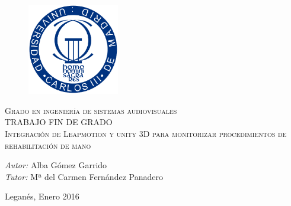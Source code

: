 \begin{titlepage}
\begin{center}

\marginsize{3.5cm}{2.5cm}{2.5cm}{2.5cm} 
\addtolength{\oddsidemargin}{0.8cm}
\vspace{1.3cm}
\begin{figure}[h]
        \centering\includegraphics[angle=0,width=4cm]{./figuras/uc3m.png}
        \label{fig:escudo}
\end{figure}
\large \textsc{Grado en ingeniería de sistemas audiovisuales} \\ [1 cm]

\large TRABAJO FIN DE GRADO\\[1 cm]

\huge \textsc{Integración de Leapmotion y unity 3D para monitorizar procedimientos de rehabilitación de mano}\\[7 cm]
\end{center}
\begin{flushleft} \Large
\emph{Autor:} Alba Gómez Garrido\\[0.5 cm]
\emph{Tutor:} Mª del Carmen Fernández Panadero  \\
\end{flushleft}

\vfill

\begin{flushright}
{\large Leganés, Enero 2016}
\end{flushright}

\end{titlepage}